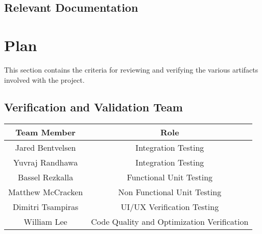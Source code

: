 \documentclass[12pt, titlepage]{article}
\begin{document}
	\subsection{Relevant Documentation}
	
	
	\citet{SRS}
	\newline
	\citet{MIS}
	\newline
	\citet{MG}
	
	\section{Plan}

	This section contains the criteria for reviewing and verifying the various artifacts involved with the project.
	
	
	\subsection{Verification and Validation Team}


	\begin{center}
		\begin{tabular}{ |c|c| } 
			\hline
			\textbf{Team Member} & \textbf{Role} \\
			\hline
			Jared Bentvelsen & Integration Testing \\
			\hline 
			Yuvraj Randhawa & Integration Testing \\
			\hline
			Bassel Rezkalla & Functional Unit Testing \\
			\hline
			Matthew McCracken & Non Functional Unit Testing \\
			\hline
			Dimitri Tsampiras & UI/UX Verification Testing \\
			\hline 
			William Lee & Code Quality and Optimization Verification\\
			\hline
		\end{tabular}
	\end{center}
	
\end{document}
